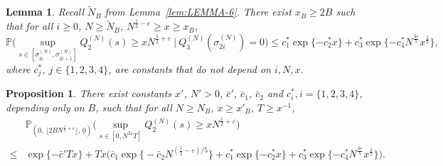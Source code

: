 \documentclass[11pt, reqno]{article}
\newtheorem{lemma}[theorem]{Lemma}
\newtheorem{prop}[theorem]{Proposition}
\numberwithin{equation}{section}
\numberwithin{theorem}{section}
\begin{document}
\begin{lemma}\label{lem:B1}
Recall $\tilde N_B$ from Lemma~\ref{lem:LEMMA-6}. There exist $x_B \ge 2B$ such that for all $i\geq 0$,  $N\geq \tilde N_B$, $N^{\frac{1}{2}-\varepsilon}\geq x\geq x_B$,
\begin{equation*}
    \mathbb{P}\Big(\sup_{s\in[\sigma^{(N)}_{2i},\sigma^{(N)}_{2i+1}]}Q^{(N)}_2(s)\geq xN^{\frac{1}{2}+\varepsilon}\ \Big|\ Q^{(N)}_3(\sigma^{(N)}_{2i})=0\Big)
    \leq c^*_1\exp\{-c^*_2x\}+c^*_3\exp\{-c^*_4N^{\frac{4\varepsilon}{5}}x^{\frac{1}{5}}\},
\end{equation*}
where $c^*_j$, $j\in\{1,2,3,4\}$, are constants that do not depend on $i,N,x$.
\end{lemma}
\begin{prop}\label{prop:bdd-Q2}
There exist constants $x'$, $N'>0$, $\bar{c}'$, $\bar{c}_1$, $\bar{c}_2$ and $c^{*}_i,i=\{1,2,3,4\}$, depending only on $B$, such that for all $N\geq N_B$, $x\geq x'_B$, $T \ge x^{-1}$,
\begin{align*}
    &\mathbb{P}_{(0, \, \lfloor 2BN^{\frac{1}{2}+\varepsilon} \rfloor, \,\underline{0})}\Big(\sup_{s\in[0,N^{2\varepsilon}T]}Q^{(N)}_2(s)\geq xN^{\frac{1}{2}+\varepsilon}\Big)\\
    \leq&  \exp\{-\bar{c}'Tx\}+Tx\big(\bar{c}_1\exp \big\{-\bar{c}_2N^{(\frac{1}{2}-\varepsilon)/5}\big\}+c^*_1\exp\{-c^*_2x\}+c^*_3\exp\{-c^*_4N^{\frac{4\varepsilon}{5}}x^{\frac{1}{5}}\}\big).
\end{align*}
\end{prop}
\end{document}
